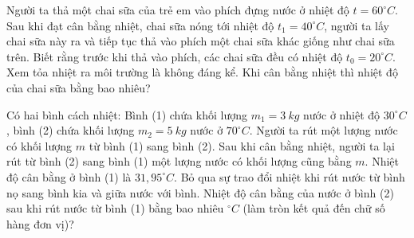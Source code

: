 \begin{ex}%
	Người ta thả một chai sữa của trẻ em vào phích đựng nước ở nhiệt độ $t = 60^\circ C$. Sau khi đạt cân bằng nhiệt, chai sữa nóng tới nhiệt độ $t_1 = 40^\circ C$, người ta lấy chai sữa này ra và tiếp tục thả vào phích một chai sữa khác giống như chai sữa trên. Biết rằng trước khi thả vào phích, các chai sữa đều có nhiệt độ $t_0 = 20^\circ C$. Xem tỏa nhiệt ra môi trường là không đáng kể. Khi cân bằng nhiệt thì nhiệt độ của chai sữa bằng bao nhiêu?
\end{ex}

\begin{ex}%
	Có hai bình cách nhiệt: Bình (1) chứa khối lượng $m_1 = 3\ kg$ nước ở nhiệt độ $30^\circ C$, bình (2) chứa khối lượng $m_2 = 5\ kg$ nước ở $70^\circ C$. Người ta rút một lượng nước có khối lượng $m$ từ bình (1) sang bình (2). Sau khi cân bằng nhiệt, người ta lại rút từ bình (2) sang bình (1) một lượng nước có khối lượng cũng bằng $m$. Nhiệt độ cân bằng ở bình (1) là $31,95^\circ C$. Bỏ qua sự trao đổi nhiệt khi rút nước từ bình nọ sang bình kia và giữa nước với bình. Nhiệt độ cân bằng của nước ở bình (2) sau khi rút nước từ bình (1) bằng bao nhiêu $^\circ C$ (làm tròn kết quả đến chữ số hàng đơn vị)?
	
\end{ex}


